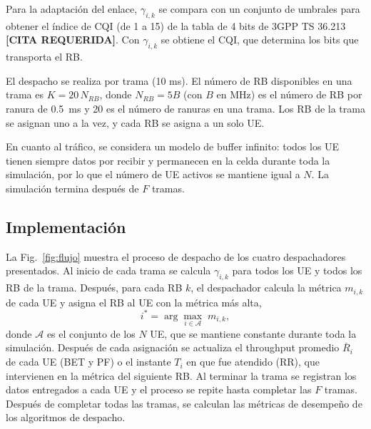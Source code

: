 Para la adaptación del enlace, $\gamma_{i,k}$ se compara con un conjunto
de umbrales para obtener el índice de CQI (de 1 a 15) de la tabla de 4
bits de 3GPP TS 36.213 \textbf{[CITA REQUERIDA]}. Con
$\gamma_{i,k}$ se obtiene el CQI, que determina los bits que transporta el RB.

El despacho se realiza por trama (10 ms). El número de RB disponibles en
una trama es $K = 20\,N_{RB}$, donde $N_{RB} = 5B$ (con $B$ en MHz) es el
número de RB por ranura de 0.5~ms y 20 es el número de ranuras en una
trama. Los RB de la trama se asignan uno a la vez, y cada RB se asigna a un
solo UE.

En cuanto al tráfico, se considera un modelo de buffer infinito: todos los
UE tienen siempre datos por recibir y permanecen en la celda durante toda
la simulación, por lo que el número de UE activos se mantiene igual a $N$.
La simulación termina después de $F$ tramas.

\subsection{Implementación}\label{subsec:implementacion}

La Fig.~\ref{fig:flujo} muestra el proceso de despacho de los
cuatro despachadores presentados. Al inicio de cada trama se calcula
$\gamma_{i,k}$ para todos los UE y todos los RB de la trama. Después, para
cada RB $k$, el despachador calcula la métrica $m_{i,k}$ de cada UE
y asigna el RB al UE con la métrica más alta,
\begin{equation}
  i^{*} = \arg\max_{i \in \mathcal{A}} \; m_{i,k},
  \label{eq:argmax}
\end{equation}
donde $\mathcal{A}$ es el conjunto de los $N$ UE, que se mantiene constante
durante toda la simulación. Después de cada asignación se actualiza el
throughput promedio $\bar{R}_i$ de cada UE (BET y PF) o el instante $T_i$ en
que fue atendido (RR), que intervienen en la métrica del siguiente RB.
Al terminar la trama se registran los datos entregados a cada UE
y el proceso se repite hasta completar las $F$ tramas. 
Después de completar todas las tramas, se calculan las métricas de
desempeño de los algoritmos de despacho.


